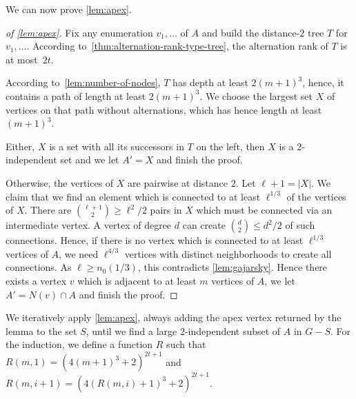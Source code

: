 We can now prove \cref{lem:apex}. 

\begin{proof}[of \cref{lem:apex}]
Fix any enumeration $v_1,\ldots$ of $A$ and
build the distance-$2$ tree $T$ for
$v_1,\ldots$. According to~\cref{thm:alternation-rank-type-tree}, 
the alternation rank of $T$ is at most~$2t$. 

According 
to~\cref{lem:number-of-nodes}, $T$ has depth at least $2(m+1)^3$, hence, 
it contains a path of length at least $2(m+1)^3$. We choose the largest set $X$
of vertices on that path without alternations, which has hence length
at least $(m+1)^3$. 

Either, $X$ is a set with all its successors in $T$ on the left, 
then $X$ is a $2$-independent set and we let $A'=X$ and finish the proof.

Otherwise, the vertices of $X$ are pairwise at distance $2$. Let $\ell+1=|X|$. 
We claim that we find an element which is connected to at least $\ell^{1/3}$
of the vertices of $X$. There are $\binom{\ell+1}{2}\geq \ell^2/2$ pairs in $X$ which 
must be connected via an intermediate vertex. A vertex of degree
$d$ can create $\binom{d}{2}\leq d^2/2$ of such connections. 
Hence, if there is no vertex which is connected to at least $\ell^{1/3}$
vertices of $A$, we need $\ell^{4/3}$ vertices with distinct neighborhoods
to create all connections. As $\ell\geq n_0(1/3)$, 
this contradicts \cref{lem:gajarsky}. Hence there exists a vertex $v$ which is 
adjacent to at least $m$ vertices of $A$, we let $A'=N(v)\cap A$ and finish 
the proof. 
\end{proof}

We iteratively apply \cref{lem:apex}, always adding the apex vertex 
returned by the lemma to the set $S$, until we find a large 
$2$-independent subset of $A$ in $G-S$. For the induction, we
define a function $R$ such that $R(m,1)=(4(m+1)^3+2)^{2t+1}$
and $R(m, i+1)=(4(R(m,i)+1)^3+2)^{2t+1}$.

